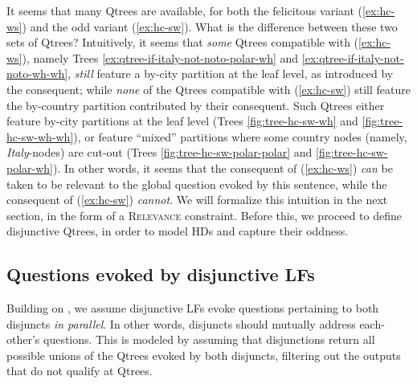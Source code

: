 It seems that many Qtrees are available, for both the felicitous variant (\ref{ex:hc-ws}) and the odd variant (\ref{ex:hc-sw}). What is the difference between these two sets of Qtrees? Intuitively, it seems that \textit{some} Qtrees compatible with (\ref{ex:hc-ws}), namely Trees \ref{ex:qtree-if-italy-not-noto-polar-wh} and \ref{ex:qtree-if-italy-not-noto-wh-wh}, \textit{still} feature a by-city partition at the leaf level, as introduced by the consequent; while \textit{none} of the Qtrees compatible with (\ref{ex:hc-sw}) still feature the by-country partition contributed by their consequent. Such Qtrees either feature by-city partitions at the leaf level (Trees \ref{fig:tree-hc-sw-wh} and \ref{fig:tree-hc-sw-wh-wh}), or feature ``mixed'' partitions where some country nodes (namely, \textit{Italy}-nodes) are cut-out (Trees \ref{fig:tree-hc-sw-polar-polar} and \ref{fig:tree-hc-sw-polar-wh}). In other words, it seems that the consequent of (\ref{ex:hc-ws}) \textit{can} be taken to be relevant to the global question evoked by this sentence, while the consequent of (\ref{ex:hc-sw}) \textit{cannot}. We will formalize this intuition in the next section, in the form of a \textsc{Relevance} constraint. Before this, we proceed to define disjunctive Qtrees, in order to model HDs and capture their oddness.

\subsection{Questions evoked by disjunctive LFs}
Building on \cite{Simons2001,Zhang2024}, we assume disjunctive LFs evoke questions pertaining to both disjuncts \textit{in parallel}. In other words, disjuncts should mutually address each-other's questions. This is modeled by assuming that disjunctions return all possible unions of the Qtrees evoked by both disjuncts, filtering out the outputs that do not qualify at Qtrees.

\begin{exe}
	\end{exe}
	
